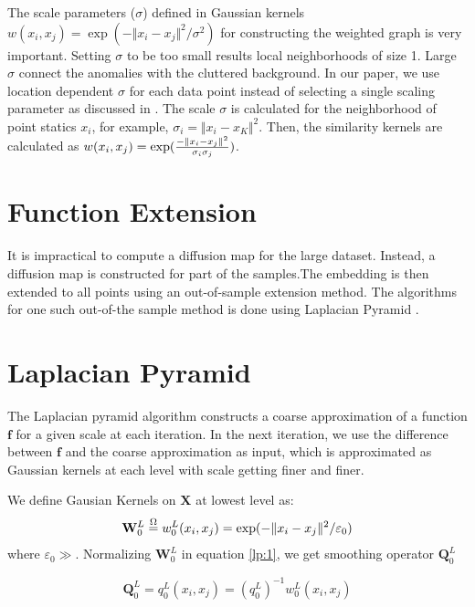 The scale parameters ($\sigma$) defined in Gaussian kernels  $w(x_{i},x_{j})=\exp(-\Vert x_{i}-x_{j}\Vert^{2}/\sigma^{2})$ for constructing the weighted graph is very important. Setting $\sigma$ to be too small results local neighborhoods of size 1. Large $\sigma$ connect the anomalies with the cluttered background. In our paper, we use  location dependent $\sigma$ for each data point instead of selecting a single scaling parameter as discussed in \citep{Gal2013}. The scale $\sigma$ is calculated for the neighborhood of point statics $x_{i}$, for example, $\sigma_{i}=\Vert x_{i}-x_{K}\Vert^{2}$. Then, the similarity kernels are calculated as $w(x_{i},x_{j})=\exp({-\Vert x_{i}-x_{j}\Vert^{2}\over\sigma_{i}\sigma_{j}})$.

\section{Function Extension}
It is impractical to compute a diffusion map for the large dataset. Instead, a diffusion map is constructed for part of the samples.The embedding is then extended to all points using an out-of-sample extension method. The algorithms for one such out-of-the sample method is done using Laplacian Pyramid \citep{Gal2013}.

\section{Laplacian Pyramid}
\label{C5:LP}

The Laplacian pyramid algorithm constructs a coarse approximation of a function $\mathbf{f}$ for a given scale at each iteration. 
In the next iteration, we use the difference between $\mathbf{f}$ and the coarse approximation as input, which is approximated as Gaussian kernels at each level with scale getting finer and finer.

We define Gausian Kernels on $\mathbf{X}$ at lowest level as:
\begin{equation}
\mathbf{W}_{0}^{L}\buildrel{\Omega}\over{=}w_{0}^{L}(x_{i},x_{j})=\exp(-\Vert x_{i}-x_{j}\Vert^{2}/\varepsilon_{0})
\label{lp:1}
\end{equation} 
where $\varepsilon_{0}\gg$. Normalizing $\mathbf{W}_{0}^{L}$ in equation \ref{lp:1}, we get smoothing operator $\mathbf{Q}_{0}^{L}$

\begin{equation}
\mathbf{Q}_{0}^{L}=q_{0}^{L}(x_{i},x_{j})=(q^{L}_{0})^{-1}w_{0}^{L}(x_{i},x_{j})
\end{equation}


